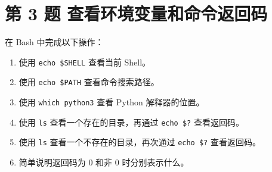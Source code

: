 \documentclass[a4paper,12pt]{report}
\begin{document}
\section{第 3 题 查看环境变量和命令返回码}


在 Bash 中完成以下操作：

\begin{enumerate}
  \item 使用 \texttt{echo \$SHELL} 查看当前 Shell。
  \item 使用 \texttt{echo \$PATH} 查看命令搜索路径。
  \item 使用 \texttt{which python3} 查看 Python 解释器的位置。
  \item 使用 \texttt{ls} 查看一个存在的目录，再通过 \texttt{echo \$?} 查看返回码。
  \item 使用 \texttt{ls} 查看一个不存在的目录，再次通过 \texttt{echo \$?} 查看返回码。
  \item 简单说明返回码为 0 和非 0 时分别表示什么。
\end{enumerate}

\end{document}
